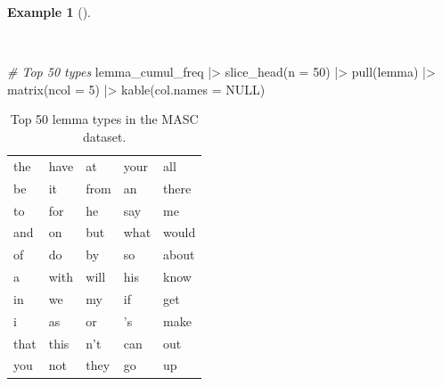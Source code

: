 \documentclass[
  letterpaper,
]{latex/krantz}
\newenvironment{Shaded}{\begin{snugshade}}{\end{snugshade}}
\newcommand{\AttributeTok}[1]{\textcolor[rgb]{0.00,0.00,0.00}{#1}}
\newcommand{\CommentTok}[1]{\textcolor[rgb]{0.00,0.00,0.00}{\textit{#1}}}
\newcommand{\ConstantTok}[1]{\textcolor[rgb]{0.00,0.00,0.00}{#1}}
\newcommand{\DecValTok}[1]{\textcolor[rgb]{0.00,0.00,0.00}{#1}}
\newcommand{\FunctionTok}[1]{\textcolor[rgb]{0.00,0.00,0.00}{#1}}
\newcommand{\NormalTok}[1]{\textcolor[rgb]{0.00,0.00,0.00}{#1}}
\newcommand{\SpecialCharTok}[1]{\textcolor[rgb]{0.00,0.00,0.00}{#1}}
\theoremstyle{definition}
\newtheorem{example}{Example}[chapter]
\theoremstyle{remark}
\begin{document}
\begin{example}[]\protect\hypertarget{exm-explore-masc-count-top-50}{}\label{exm-explore-masc-count-top-50}

~

\begin{Shaded}
\begin{Highlighting}[]
\CommentTok{\# Top 50 types}
\NormalTok{lemma\_cumul\_freq }\SpecialCharTok{|\textgreater{}}
  \FunctionTok{slice\_head}\NormalTok{(}\AttributeTok{n =} \DecValTok{50}\NormalTok{) }\SpecialCharTok{|\textgreater{}}
  \FunctionTok{pull}\NormalTok{(lemma) }\SpecialCharTok{|\textgreater{}}
  \FunctionTok{matrix}\NormalTok{(}\AttributeTok{ncol =} \DecValTok{5}\NormalTok{) }\SpecialCharTok{|\textgreater{}}
  \FunctionTok{kable}\NormalTok{(}\AttributeTok{col.names =} \ConstantTok{NULL}\NormalTok{)}
\end{Highlighting}
\end{Shaded}

\begin{longtable}[]{@{}
  >{\raggedright\arraybackslash}p{}
  >{\raggedright\arraybackslash}p{}
  >{\raggedright\arraybackslash}p{}
  >{\raggedright\arraybackslash}p{}
  >{\raggedright\arraybackslash}p{}@{}}

\caption{\label{tbl-explore-masc-count-top-50}Top 50 lemma types in the
MASC dataset.}

\tabularnewline

\toprule\noalign{}
\endhead
\bottomrule\noalign{}
\endlastfoot
the & have & at & your & all \\
be & it & from & an & there \\
to & for & he & say & me \\
and & on & but & what & would \\
of & do & by & so & about \\
a & with & will & his & know \\
in & we & my & if & get \\
i & as & or & 's & make \\
that & this & n't & can & out \\
you & not & they & go & up \\

\end{longtable}

\end{example}
\end{document}
